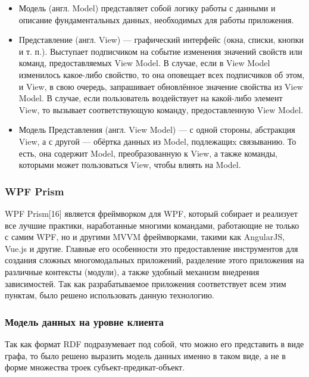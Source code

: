 \documentclass[12pt]{article}
\begin{document}
\begin{itemize}
    \item Модель (англ. Model) представляет собой логику работы с данными и описание фундаментальных данных, необходимых для работы приложения.

    \item Представление (англ. View) — графический интерфейс (окна, списки, кнопки и т. п.). Выступает подписчиком на событие изменения значений свойств или команд, предоставляемых View Model. В случае, если в View Model изменилось какое-либо свойство, то она оповещает всех подписчиков об этом, и View, в свою очередь, запрашивает обновлённое значение свойства из View Model. В случае, если пользователь воздействует на какой-либо элемент View, то вызывает соответствующую команду, предоставленную View Model.

    \item Модель Представления (англ. View Model) — с одной стороны, абстракция View, а с другой — обёртка данных из Model, подлежащиx связыванию. То есть, она содержит Model, преобразованную к View, а также команды, которыми может пользоваться View, чтобы влиять на Model.
\end{itemize}

\subsubsection{WPF Prism}
\qquad WPF Prism[16] является фреймворком для WPF, который собирает и реализует все лучшие практики, наработанные многими командами, работающие не только с самим WPF, но и другими MVVM фреймворками, такими как AngularJS, Vue.js и другие. Главные его особенности это предоставление инструментов для создания сложных многомодальных приложений, разделение этого приложения на различные контексты (модули), а также удобный механизм внедрения зависимостей. Так как разрабатываемое приложения соответствует всем этим пунктам, было решено использовать данную технологию.\par

\subsubsection{Модель данных на уровне клиента}
\qquad Так как формат RDF подразумевает под собой, что можно его представить в виде графа, то было решено выразить модель данных именно в таком виде, а не в форме множества троек субъект-предикат-объект.
\end{document}
